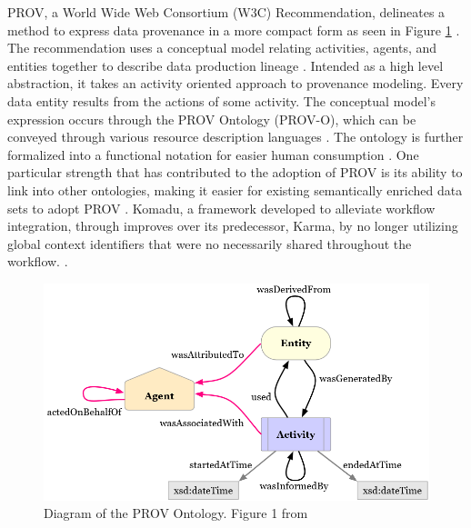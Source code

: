 PROV, a World Wide Web Consortium (W3C) Recommendation, delineates a method to express data provenance in a more compact form as seen in Figure \ref{PROVO} \cite{Gil2013a} \cite{Groth2013}.
The recommendation uses a conceptual model relating activities, agents, and entities together to describe data production lineage \cite{Moreau2013c} \cite{Nies2013} \cite{Nies2013a}.
Intended as a high level abstraction, it takes an activity oriented approach to provenance modeling.
Every data entity results from the actions of some activity.
The conceptual model's expression occurs through the PROV Ontology (PROV-O), which can be conveyed through various resource description languages \cite{Hua2013} \cite{Klyne2013}.
The ontology is further formalized into a functional notation for easier human consumption \cite{Moreau2013b} \cite{Cheney2013a}.
One particular strength that has contributed to the adoption of PROV is its ability to link into other ontologies, making it easier for existing semantically enriched data sets to adopt PROV \cite{Miles2013} \cite{Moreau2013}.
Komadu, a framework developed to alleviate workflow integration, through improves over its predecessor, Karma, by no longer utilizing global context identifiers that were no necessarily shared throughout the workflow. \cite{Suriarachchi_2015}.

\begin{figure}
	\centering
	\includegraphics[scale=0.5]{figures/ProvO.png}
	\caption[Diagram of the PROV Ontology.]{Diagram of the PROV Ontology.  Figure 1 from \cite{Lebo2013}}
	\label{PROVO}
\end{figure}

